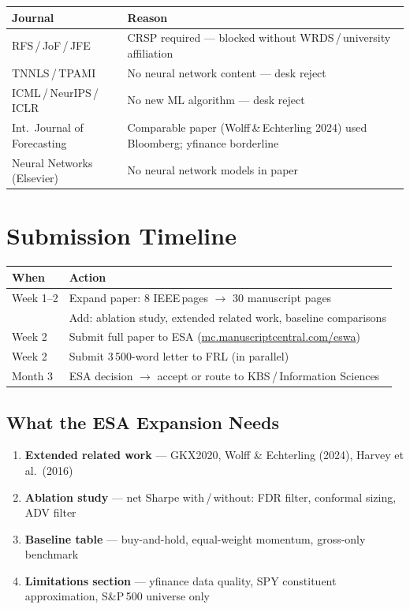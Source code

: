 \documentclass[11pt,a4paper]{article}
\begin{document}
\begin{tabularx}{\linewidth}{lX}
\toprule
\textbf{Journal} & \textbf{Reason}\\
\midrule
RFS\,/\,JoF\,/\,JFE & CRSP required — blocked without WRDS\,/\,university affiliation\\
TNNLS\,/\,TPAMI     & No neural network content — desk reject\\
ICML\,/\,NeurIPS\,/\,ICLR & No new ML algorithm — desk reject\\
Int.\ Journal of Forecasting & Comparable paper (Wolff\,\&\,Echterling 2024) used Bloomberg; yfinance borderline\\
Neural Networks (Elsevier) & No neural network models in paper\\
\bottomrule
\end{tabularx}

\section*{Submission Timeline}

\begin{tabularx}{\linewidth}{lX}
\toprule
\textbf{When} & \textbf{Action}\\
\midrule
Week 1--2 & Expand paper: 8 IEEE\,pages $\to$ 30 manuscript pages\\
          & Add: ablation study, extended related work, baseline comparisons\\
Week 2    & Submit full paper to ESA (\url{mc.manuscriptcentral.com/eswa})\\
Week 2    & Submit 3\,500-word letter to FRL (in parallel)\\
Month 3   & ESA decision $\to$ accept or route to KBS\,/\,Information Sciences\\
\bottomrule
\end{tabularx}

\vspace{0.7em}
\subsection*{What the ESA Expansion Needs}
\begin{enumerate}[leftmargin=1.5em,itemsep=2pt]
  \item \textbf{Extended related work} --- GKX2020, Wolff \& Echterling (2024), Harvey et al.\ (2016)
  \item \textbf{Ablation study} --- net Sharpe with\,/\,without: FDR filter, conformal sizing, ADV filter
  \item \textbf{Baseline table} --- buy-and-hold, equal-weight momentum, gross-only benchmark
  \item \textbf{Limitations section} --- yfinance data quality, SPY constituent approximation, S\&P\,500 universe only
\end{enumerate}
\end{document}
